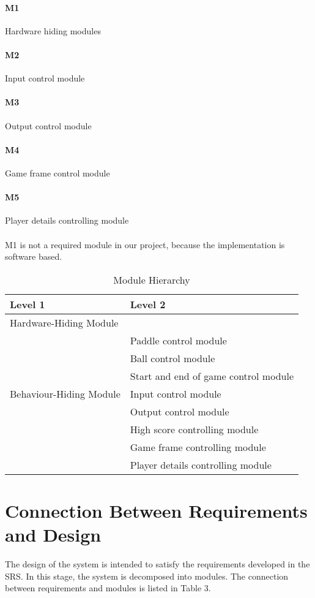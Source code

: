 \documentclass[12pt,letterpaper]{article}
\begin{document}
	\paragraph{M1} Hardware hiding modules
	\paragraph{M2} Input control module
	\paragraph{M3} Output control module
	\paragraph{M4} Game frame control module
	\paragraph{M5} Player details controlling module
	\paragraph{} M1 is not a required module in our project, because the implementation is software based.

\begin{table}[h!]
\centering
\begin{tabular}{p{} p{}}
\toprule
\textbf{Level 1} & \textbf{Level 2}\\
\midrule
{Hardware-Hiding Module} & ~ \\
\midrule
\multirow{7}{0.3\textwidth}{Behaviour-Hiding Module} & Paddle control module\\
& Ball control module\\
& Start and end of game control module\\
& Input control module\\
& Output control module\\
& High score controlling module\\
\midrule
\multirow{3}{0.3\textwidth}{Software Decision Module} & Game frame controlling module\\
& Player details controlling module\\
\bottomrule
\end{tabular}
\caption{Module Hierarchy}
\label{TblMH}
\end{table}

	\section{Connection Between Requirements and Design}
	The design of the system is intended to satisfy the requirements developed in the SRS. In this stage, the system is decomposed into modules. The connection between requirements and modules is listed in Table 3.
\end{document}
